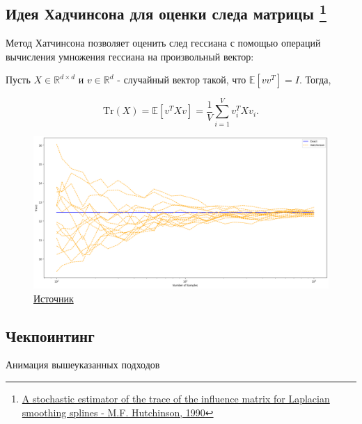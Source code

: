 \documentclass[
  russian,
  letterpaper,
  DIV=11,
  numbers=noendperiod]{scrartcl}
\begin{document}
\subsection[Идея Хадчинсона для оценки следа матрицы
]{\texorpdfstring{Идея Хадчинсона для оценки следа матрицы
\footnote{\href{https://www.tandfonline.com/doi/abs/10.1080/03610919008812866}{A
  stochastic estimator of the trace of the influence matrix for
  Laplacian smoothing splines - M.F. Hutchinson, 1990}}}{Идея Хадчинсона для оценки следа матрицы }}\label{ux438ux434ux435ux44f-ux445ux430ux434ux447ux438ux43dux441ux43eux43dux430-ux434ux43bux44f-ux43eux446ux435ux43dux43aux438-ux441ux43bux435ux434ux430-ux43cux430ux442ux440ux438ux446ux44b}

Метод Хатчинсона позволяет оценить след гессиана с помощью операций
вычисления умножения гессиана на произвольный вектор:

Пусть \(X \in \mathbb{R}^{d \times d}\) и \(v \in \mathbb{R}^d\) -
случайный вектор такой, что \(\mathbb{E}[vv^T] = I\). Тогда,

\[
\mathrm{Tr}(X) = \mathbb{E}[v^TXv] = \frac{1}{V}\sum_{i=1}^{V}v_i^TXv_i.
\]

\begin{figure}[H]

{\centering \includegraphics[width=0.8\linewidth,height=\textheight,keepaspectratio]{Hutchinson_trace_est.pdf}

}

\caption{\href{https://docs.backpack.pt/en/master/use_cases/example_trace_estimation.html}{Источник}}

\end{figure}%

\subsection{Чекпоинтинг}\label{ux447ux435ux43aux43fux43eux438ux43dux442ux438ux43dux433}

Анимация вышеуказанных подходов
\href{https://github.com/cybertronai/gradient-checkpointing}{\faGithub}
\end{document}

